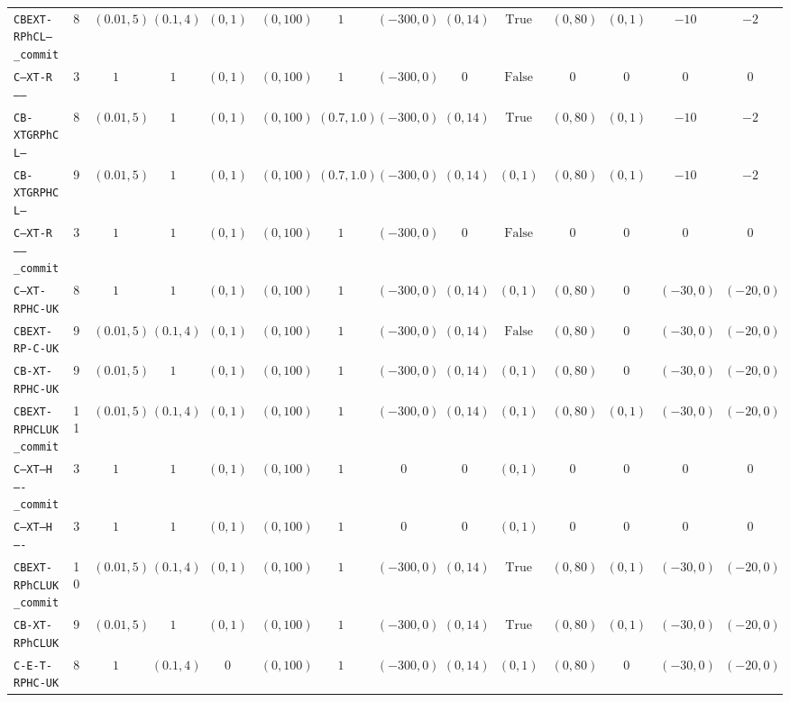 {\begin{tabular}{lccccccccccccc}
\texttt{CBEXT-RPhCL--_commit} & 8 & $(0.01,5)$ & $(0.1,4)$ & $(0,1)$ & $(0,100)$ & $1$ & $(-300,0)$ & $(0,14)$ & $\mathrm{True}$ & $(0,80)$ & $(0,1)$ & $-10$ & $-2$ \\
\texttt{C--XT-R------} & 3 & $1$ & $1$ & $(0,1)$ & $(0,100)$ & $1$ & $(-300,0)$ & $0$ & $\mathrm{False}$ & $0$ & $0$ & $0$ & $0$ \\
\texttt{CB-XTGRPhCL--} & 8 & $(0.01,5)$ & $1$ & $(0,1)$ & $(0,100)$ & $(0.7,1.0)$ & $(-300,0)$ & $(0,14)$ & $\mathrm{True}$ & $(0,80)$ & $(0,1)$ & $-10$ & $-2$ \\
\texttt{CB-XTGRPHCL--} & 9 & $(0.01,5)$ & $1$ & $(0,1)$ & $(0,100)$ & $(0.7,1.0)$ & $(-300,0)$ & $(0,14)$ & $(0,1)$ & $(0,80)$ & $(0,1)$ & $-10$ & $-2$ \\
\texttt{C--XT-R------_commit} & 3 & $1$ & $1$ & $(0,1)$ & $(0,100)$ & $1$ & $(-300,0)$ & $0$ & $\mathrm{False}$ & $0$ & $0$ & $0$ & $0$ \\
\texttt{C--XT-RPHC-UK} & 8 & $1$ & $1$ & $(0,1)$ & $(0,100)$ & $1$ & $(-300,0)$ & $(0,14)$ & $(0,1)$ & $(0,80)$ & $0$ & $(-30,0)$ & $(-20,0)$ \\
\texttt{CBEXT-RP-C-UK} & 9 & $(0.01,5)$ & $(0.1,4)$ & $(0,1)$ & $(0,100)$ & $1$ & $(-300,0)$ & $(0,14)$ & $\mathrm{False}$ & $(0,80)$ & $0$ & $(-30,0)$ & $(-20,0)$ \\
\texttt{CB-XT-RPHC-UK} & 9 & $(0.01,5)$ & $1$ & $(0,1)$ & $(0,100)$ & $1$ & $(-300,0)$ & $(0,14)$ & $(0,1)$ & $(0,80)$ & $0$ & $(-30,0)$ & $(-20,0)$ \\
\texttt{CBEXT-RPHCLUK_commit} & 11 & $(0.01,5)$ & $(0.1,4)$ & $(0,1)$ & $(0,100)$ & $1$ & $(-300,0)$ & $(0,14)$ & $(0,1)$ & $(0,80)$ & $(0,1)$ & $(-30,0)$ & $(-20,0)$ \\
\texttt{C--XT---H----_commit} & 3 & $1$ & $1$ & $(0,1)$ & $(0,100)$ & $1$ & $0$ & $0$ & $(0,1)$ & $0$ & $0$ & $0$ & $0$ \\
\texttt{C--XT---H----} & 3 & $1$ & $1$ & $(0,1)$ & $(0,100)$ & $1$ & $0$ & $0$ & $(0,1)$ & $0$ & $0$ & $0$ & $0$ \\
\texttt{CBEXT-RPhCLUK_commit} & 10 & $(0.01,5)$ & $(0.1,4)$ & $(0,1)$ & $(0,100)$ & $1$ & $(-300,0)$ & $(0,14)$ & $\mathrm{True}$ & $(0,80)$ & $(0,1)$ & $(-30,0)$ & $(-20,0)$ \\
\texttt{CB-XT-RPhCLUK} & 9 & $(0.01,5)$ & $1$ & $(0,1)$ & $(0,100)$ & $1$ & $(-300,0)$ & $(0,14)$ & $\mathrm{True}$ & $(0,80)$ & $(0,1)$ & $(-30,0)$ & $(-20,0)$ \\
\texttt{C-E-T-RPHC-UK} & 8 & $1$ & $(0.1,4)$ & $0$ & $(0,100)$ & $1$ & $(-300,0)$ & $(0,14)$ & $(0,1)$ & $(0,80)$ & $0$ & $(-30,0)$ & $(-20,0)$ \\

\end{tabular}}
